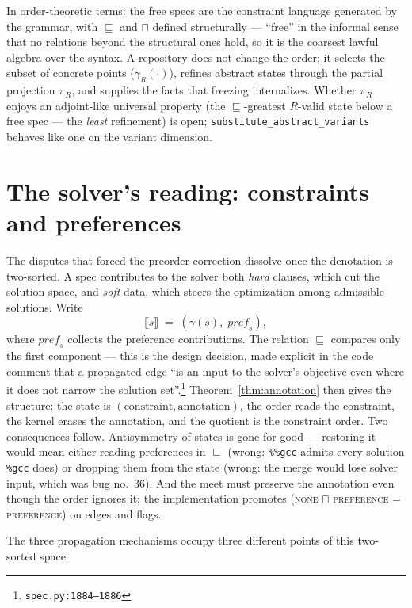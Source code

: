 \documentclass[11pt]{article}
\theoremstyle{definition}
\theoremstyle{remark}
\newcommand{\sat}{\sqsubseteq}
\newcommand{\meet}{\sqcap}
\newcommand{\den}[1]{\gamma(#1)}
\newcommand{\denR}[1]{\gamma_{R}(#1)}
\newcommand{\code}[1]{\texttt{#1}}
\newcommand{\src}[1]{\footnote{\code{#1}}}
\begin{document}
In order-theoretic terms: the free specs are the constraint language
generated by the grammar, with $\sat$ and $\meet$ defined structurally ---
``free'' in the informal sense that no relations beyond the structural ones
hold, so it is the coarsest lawful algebra over the syntax.  A repository
does not change the order; it selects the subset of concrete points
($\denR{\cdot}$), refines abstract states through the partial projection
$\pi_R$, and supplies the facts that freezing internalizes.  Whether
$\pi_R$ enjoys an adjoint-like universal property (the $\sat$-greatest
$R$-valid state below a free spec --- the \emph{least} refinement) is open;
\code{substitute\_abstract\_variants} behaves like one on the variant
dimension.

\section{The solver's reading: constraints and preferences}\label{sec:solver}

The disputes that forced the preorder correction dissolve once the denotation
is two-sorted.  A spec contributes to the solver both \emph{hard} clauses,
which cut the solution space, and \emph{soft} data, which steers the
optimization among admissible solutions.  Write
\[
  \llbracket s \rrbracket \;=\; (\den{s},\; \mathit{pref}_s),
\]
where $\mathit{pref}_s$ collects the preference contributions.  The relation
$\sat$ compares only the first component --- this is the design decision,
made explicit in the code comment that a propagated edge ``is an input to the
solver's objective even where it does not narrow the solution
set''.\src{spec.py:1884--1886}  Theorem~\ref{thm:annotation} then gives the
structure: the state is $(\text{constraint}, \text{annotation})$, the order
reads the constraint, the kernel erases the annotation, and the quotient is
the constraint order.  Two consequences follow.  Antisymmetry of states is
gone for good --- restoring it would mean either reading preferences in
$\sat$ (wrong: \code{\%\%gcc} admits every solution \code{\%gcc} does) or
dropping them from the state (wrong: the merge would lose solver input,
which was bug no.~36).  And the meet must preserve the annotation even
though the order ignores it; the implementation promotes
(\textsc{none} $\meet$ \textsc{preference} = \textsc{preference}) on edges
and flags.

The three propagation mechanisms occupy three different points of this
two-sorted space:
\end{document}
